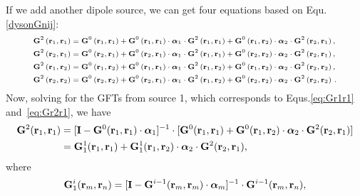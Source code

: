 If we add another dipole source, we can get four equations based on Equ.\eqref{dysonGnij}:
\begin{subequations}
{\scriptsize
\begin{align}
 \mathbf{G}^2\left(\mathbf{r}_1,\mathbf{r}_1\right) &= \mathbf{G}^{0}\left(\mathbf{r}_1,\mathbf{r}_1\right) +  \mathbf{G}^{0}\left(\mathbf{r}_1,\mathbf{r}_1\right)\cdot {\bm \alpha}_1\cdot \mathbf{G}^2\left(\mathbf{r}_1,\mathbf{r}_1\right) + \mathbf{G}^{0}\left(\mathbf{r}_1,\mathbf{r}_2\right) \cdot {\bm \alpha}_2  \cdot \mathbf{G}^2\left(\mathbf{r}_2,\mathbf{r}_1 \right),  \label{eq:Gr1r1} \\
\label{eq:Gr2r1}
 \bG^2\left(\mathbf{r}_2,\mathbf{r}_1\right) &= \bG^0\left(\mathbf{r}_2,\mathbf{r}_1\right) + \bG^0\left(\mathbf{r}_2,\mathbf{r}_1\right)\cdot \balpha_1 \cdot \bG^2\left(\mathbf{r}_1,\mathbf{r}_1\right) + \bG^0\left(\mathbf{r}_2,\mathbf{r}_2\right)\cdot \balpha_2\cdot \bG^2\left(\mathbf{r}_2,\mathbf{r}_1\right),\\
\label{eq:Gr1r2}
 \bG^2\left(\mathbf{r}_1,\mathbf{r}_2\right) &= \bG^0\left(\mathbf{r}_1,\mathbf{r}_2\right) + \bG^0\left(\mathbf{r}_1,\mathbf{r}_1\right)\cdot \balpha_1\cdot \bG^2\left(\mathbf{r}_1,\mathbf{r}_2\right) + \bG^0\left(\mathbf{r}_1,\mathbf{r}_2\right)\cdot \balpha_2 \cdot \bG^2\left(\mathbf{r}_2,\mathbf{r}_2\right),\\
\label{eq:Gr2r2}
 \bG^2\left(\mathbf{r}_2,\mathbf{r}_2\right) &= \bG^0\left(\mathbf{r}_2,\mathbf{r}_2\right) + \bG^0\left(\mathbf{r}_2,\mathbf{r}_1\right) \cdot \balpha_1\cdot \bG^2\left(\mathbf{r}_1,\mathbf{r}_2\right) +  \bG^0\left(\mathbf{r}_2,\mathbf{r}_2\right)\cdot\balpha_2\cdot \bG^2\left(\mathbf{r}_2,\mathbf{r}_2\right) \,.
\end{align}}
\end{subequations}
Now, solving for the GFTs from source 1, which corresponds to Equs.\eqref{eq:Gr1r1} and~\eqref{eq:Gr2r1}, we have
\begin{equation}
\label{G211_1}
\begin{aligned}
\mathbf{G}^2(\mathbf{r}_1,\mathbf{r}_1) &=[\mathbf{I}-\mathbf{G}^0(\mathbf{r}_1,\mathbf{r}_1)\cdot {\bm \alpha}_1]^{-1}\cdot [\mathbf{G}^0(\mathbf{r}_1,\mathbf{r}_1)+\mathbf{G}^0(\mathbf{r}_1,\mathbf{r}_2)\cdot {\bm \alpha}_2\cdot \mathbf{G}^2(\mathbf{r}_2,\mathbf{r}_1)] \\
 &= \mathbf{G}^1_1(\mathbf{r}_1,\mathbf{r}_1)+\mathbf{G}^1_1(\mathbf{r}_1,\mathbf{r}_2)\cdot{\bm \alpha}_2\cdot \mathbf{G}^2(\mathbf{r}_2,\mathbf{r}_1),
\end{aligned}
\end{equation}
where
\begin{equation}
\label{Gi1}
\mathbf{G}^i_1(\mathbf{r}_m,\mathbf{r}_n)=[\mathbf{I}-\mathbf{G}^{i-1}(\mathbf{r}_m,\mathbf{r}_m)\cdot{\bm \alpha}_m]^{-1}\cdot \mathbf{G}^{i-1}(\mathbf{r}_m,\mathbf{r}_n),
\end{equation}
